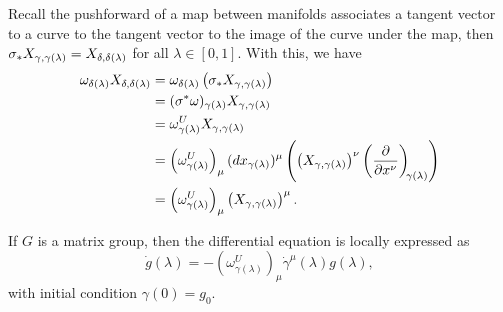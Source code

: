 Recall the pushforward of a map between manifolds associates a tangent vector to a curve to the tangent vector to the image of the curve under the map, then \({\sigma}_{\ast{}}{X_{\gamma,\gamma(\lambda)}} = X_{\delta,\delta(\lambda)}\) for all \(\lambda \in [0,1]\). With this, we have
\begin{align*}
    \omega_{\delta(\lambda)}X_{\delta, \delta(\lambda)} &= \omega_{\delta(\lambda)}\left(\pf{\sigma}{X_{\gamma,\gamma(\lambda)}}\right)\\
                                                        &= (\pb{\sigma}{\omega})_{\gamma(\lambda)}X_{\gamma,\gamma(\lambda)}\\
                                                        &= \omega^U_{\gamma(\lambda)}X_{\gamma,\gamma(\lambda)}\\
                                                        &= \left(\omega^U_{\gamma(\lambda)}\right)_\mu (dx_{\gamma(\lambda)})^\mu \left(\left(X_{\gamma, \gamma(\lambda)}\right)^\nu\bvec{x^\nu}{\gamma(\lambda)}\right)\\
                                                        &= \left(\omega^U_{\gamma(\lambda)}\right)_\mu \left(X_{\gamma,\gamma(\lambda)}\right)^\mu.
\end{align*}
\begin{corollary}
    If \(G\) is a matrix group, then the differential equation is locally expressed as
    \begin{equation*}
        \dot{g}(\lambda) = - \left(\omega_{\gamma(\lambda)}^{U}\right)_\mu \dot{\gamma}^\mu(\lambda) g(\lambda),
    \end{equation*}
    with initial condition \(\gamma(0) = g_0\).
\end{corollary}


